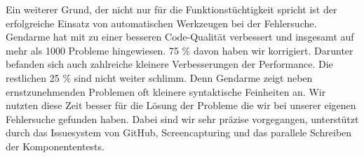 Ein weiterer Grund, der nicht nur für die Funktionstüchtigkeit spricht ist der erfolgreiche Einsatz von automatischen Werkzeugen bei der Fehlersuche. Gendarme hat mit zu einer besseren Code-Qualität verbessert und insgesamt auf mehr als 1000 Probleme hingewiesen. 75 \% davon haben wir korrigiert. Darunter befanden sich auch zahlreiche kleinere Verbesserungen der Performance. Die restlichen 25 \% sind nicht weiter schlimm. Denn Gendarme zeigt neben ernstzunehmenden Problemen oft kleinere syntaktische Feinheiten an. Wir nutzten diese Zeit besser für die Lösung der Probleme die wir bei unserer eigenen Fehlersuche gefunden haben. Dabei sind wir sehr präzise vorgegangen, unterstützt durch das Issuesystem von GitHub, Screencapturing und das parallele Schreiben der Komponententests. 








